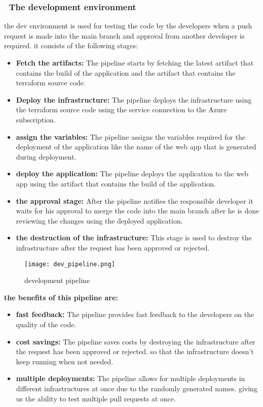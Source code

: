 \subsubsection*{ \textbullet\ The development environment}
the dev environment is used for testing the code by the developers when a push request is made into the main branch and approval from another developer is required. it consists of the following stages:
\begin{itemize}
    \item \textbf{Fetch the artifacts:} The pipeline starts by fetching the latest artifact that contains the build of the application and the artifact that contains the terraform source code.
    \item \textbf{Deploy the infrastructure:} The pipeline deploys the infrastructure using the terraform source code using the service connection to the Azure subscription.
    \item \textbf{assign the variables:} The pipeline assigns the variables required for the deployment of the application like the name of the web app that is generated during deployment.
    \item \textbf{deploy the application:} The pipeline deploys the application to the web app using the artifact that contains the build of the application.
    \item \textbf{the approval stage:} After the pipeline notifies the responsible developer it waits for his approval to merge the code into the main branch after he is done reviewing the changes using the deployed application.
    \item \textbf{the destruction of the infrastructure:} This stage is used to destroy the infrastructure after the request has been approved or rejected.
\end{itemize}

\begin{figure}[H]
    \centering
    \texttt{[image: dev\_pipeline.png]}
    \caption{development pipeline}
    \label{fig:devPipeline}
\end{figure}

\textbf{the benefits of this pipeline are:}
\begin{itemize}
    \item \textbf{fast feedback:} The pipeline provides fast feedback to the developers on the quality of the code.
    \item \textbf{cost savings:} The pipeline saves costs by destroying the infrastructure after the request has been approved or rejected. so that the infrastructure doesn't keep running when not needed.
    \item \textbf{multiple deployments:} The pipeline allows for multiple deployments in different infrastructures at once due to the randomly generated names. giving us the ability to test multiple pull requests at once.
\end{itemize}
